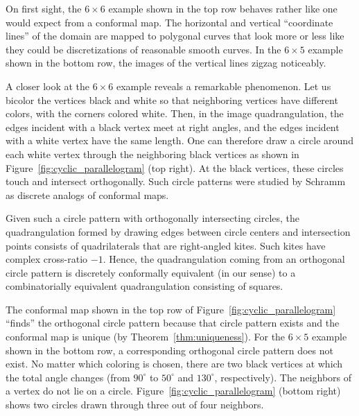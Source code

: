 \documentclass[Thesis]{subfiles}
\begin{document}
On first sight, the $6\times 6$ example shown in the top row behaves
rather like one would expect from a conformal map. The horizontal and
vertical ``coordinate lines'' of the domain are mapped to polygonal
curves that look more or less like they could be discretizations of
reasonable smooth curves. In the $6\times 5$ example shown in the
bottom row, the images of the vertical lines zigzag noticeably.

A closer look at the $6\times 6$ example reveals a remarkable
phenomenon. Let us bicolor the vertices black and white so that
neighboring vertices have different colors, with the corners colored
white. Then, in the image quadrangulation, the edges incident with a
black vertex meet at right angles, and the edges incident with a white
vertex have the same length. One can therefore draw a circle around
each white vertex through the neighboring black vertices as shown in
Figure~\ref{fig:cyclic_parallelogram} (top right). At the black
vertices, these circles touch and intersect orthogonally. Such circle
patterns were studied by Schramm~\cite{S97} as discrete analogs of
conformal maps.

Given such a circle pattern with orthogonally intersecting circles,
the quadrangulation formed by drawing edges between circle centers and
intersection points consists of quadrilaterals that are right-angled
kites. Such kites have complex cross-ratio $-1$. Hence, the
quadrangulation coming from an orthogonal circle pattern is discretely
conformally equivalent (in our sense) to a combinatorially equivalent
quadrangulation consisting of squares. 

The conformal map shown in the top row of
Figure~\ref{fig:cyclic_parallelogram} ``finds'' the orthogonal circle
pattern because that circle pattern exists and the conformal map is
unique (by Theorem~\ref{thm:uniqueness}). For the $6\times 5$ example shown
in the bottom row, a corresponding orthogonal circle pattern does not
exist. No matter which coloring is chosen, there are two black
vertices at which the total angle changes (from $90^{\circ}$ to
$50^{\circ}$ and $130^{\circ}$, respectively). The neighbors of a
vertex do not lie on a circle. Figure~\ref{fig:cyclic_parallelogram}
(bottom right) shows two circles drawn through three out of four neighbors.

\end{document}
